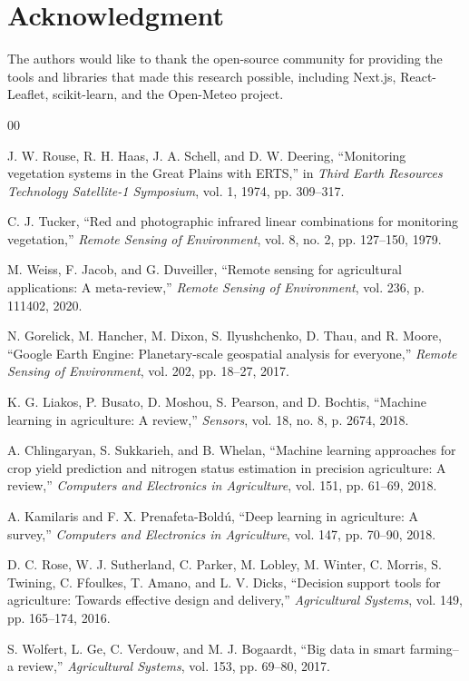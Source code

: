 \documentclass[journal]{IEEEtran}
\begin{document}
\section*{Acknowledgment}

The authors would like to thank the open-source community for providing the tools and libraries that made this research possible, including Next.js, React-Leaflet, scikit-learn, and the Open-Meteo project.

\begin{thebibliography}{00}

 J. W. Rouse, R. H. Haas, J. A. Schell, and D. W. Deering, ``Monitoring vegetation systems in the Great Plains with ERTS,'' in \textit{Third Earth Resources Technology Satellite-1 Symposium}, vol. 1, 1974, pp. 309--317.

 C. J. Tucker, ``Red and photographic infrared linear combinations for monitoring vegetation,'' \textit{Remote Sensing of Environment}, vol. 8, no. 2, pp. 127--150, 1979.

 M. Weiss, F. Jacob, and G. Duveiller, ``Remote sensing for agricultural applications: A meta-review,'' \textit{Remote Sensing of Environment}, vol. 236, p. 111402, 2020.

 N. Gorelick, M. Hancher, M. Dixon, S. Ilyushchenko, D. Thau, and R. Moore, ``Google Earth Engine: Planetary-scale geospatial analysis for everyone,'' \textit{Remote Sensing of Environment}, vol. 202, pp. 18--27, 2017.

 K. G. Liakos, P. Busato, D. Moshou, S. Pearson, and D. Bochtis, ``Machine learning in agriculture: A review,'' \textit{Sensors}, vol. 18, no. 8, p. 2674, 2018.

 A. Chlingaryan, S. Sukkarieh, and B. Whelan, ``Machine learning approaches for crop yield prediction and nitrogen status estimation in precision agriculture: A review,'' \textit{Computers and Electronics in Agriculture}, vol. 151, pp. 61--69, 2018.

 A. Kamilaris and F. X. Prenafeta-Boldú, ``Deep learning in agriculture: A survey,'' \textit{Computers and Electronics in Agriculture}, vol. 147, pp. 70--90, 2018.

 D. C. Rose, W. J. Sutherland, C. Parker, M. Lobley, M. Winter, C. Morris, S. Twining, C. Ffoulkes, T. Amano, and L. V. Dicks, ``Decision support tools for agriculture: Towards effective design and delivery,'' \textit{Agricultural Systems}, vol. 149, pp. 165--174, 2016.

 S. Wolfert, L. Ge, C. Verdouw, and M. J. Bogaardt, ``Big data in smart farming--a review,'' \textit{Agricultural Systems}, vol. 153, pp. 69--80, 2017.

\end{thebibliography}

\vspace{12pt}
\end{document}
